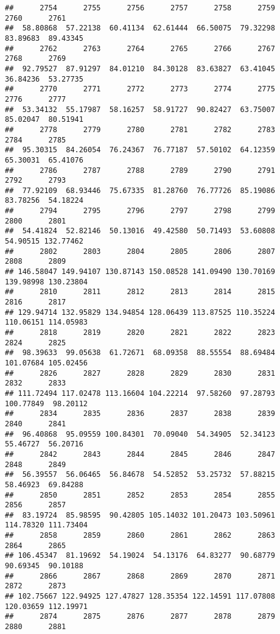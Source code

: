 \documentclass[
]{article}
\begin{document}
\begin{verbatim}
##      2754      2755      2756      2757      2758      2759      2760      2761 
##  58.80868  57.22138  60.41134  62.61444  66.50075  79.32298  83.89683  89.43345 
##      2762      2763      2764      2765      2766      2767      2768      2769 
##  92.79527  87.91297  84.01210  84.30128  83.63827  63.41045  36.84236  53.27735 
##      2770      2771      2772      2773      2774      2775      2776      2777 
##  53.34132  55.17987  58.16257  58.91727  90.82427  63.75007  85.02047  80.51941 
##      2778      2779      2780      2781      2782      2783      2784      2785 
##  95.30315  84.26054  76.24367  76.77187  57.50102  64.12359  65.30031  65.41076 
##      2786      2787      2788      2789      2790      2791      2792      2793 
##  77.92109  68.93446  75.67335  81.28760  76.77726  85.19086  83.78256  54.18224 
##      2794      2795      2796      2797      2798      2799      2800      2801 
##  54.41824  52.82146  50.13016  49.42580  50.71493  53.60808  54.90515 132.77462 
##      2802      2803      2804      2805      2806      2807      2808      2809 
## 146.58047 149.94107 130.87143 150.08528 141.09490 130.70169 139.98998 130.23804 
##      2810      2811      2812      2813      2814      2815      2816      2817 
## 129.94714 132.95829 134.94854 128.06439 113.87525 110.35224 110.06151 114.05983 
##      2818      2819      2820      2821      2822      2823      2824      2825 
##  98.39633  99.05638  61.72671  68.09358  88.55554  88.69484 101.07684 105.02456 
##      2826      2827      2828      2829      2830      2831      2832      2833 
## 111.72494 117.02478 113.16604 104.22214  97.58260  97.28793 100.77849  98.20112 
##      2834      2835      2836      2837      2838      2839      2840      2841 
##  96.40868  95.09559 100.84301  70.09040  54.34905  52.34123  55.46727  56.20716 
##      2842      2843      2844      2845      2846      2847      2848      2849 
##  56.39557  56.06465  56.84678  54.52852  53.25732  57.88215  58.46923  69.84288 
##      2850      2851      2852      2853      2854      2855      2856      2857 
##  83.19724  85.98595  90.42805 105.14032 101.20473 103.50961 114.78320 111.73404 
##      2858      2859      2860      2861      2862      2863      2864      2865 
## 106.45347  81.19692  54.19024  54.13176  64.83277  90.68779  90.69345  90.10188 
##      2866      2867      2868      2869      2870      2871      2872      2873 
## 102.75667 122.94925 127.47827 128.35354 122.14591 117.07808 120.03659 112.19971 
##      2874      2875      2876      2877      2878      2879      2880      2881 

\end{verbatim}
\end{document}

